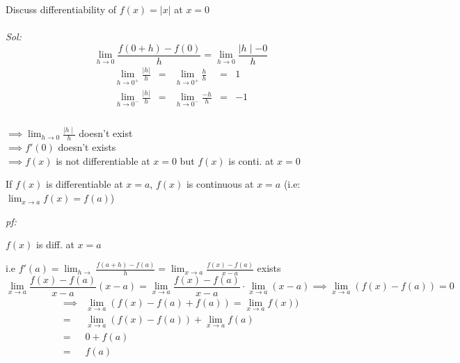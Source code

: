 \begin{eg}
Discuss differentiability of $f(x) = | x |$ at $x = 0$\\\\
\textit{Sol:}
$$\displaystyle \lim_{h \to 0} \frac{f(0 + h) - f(0)}{h} = \lim_{h \to 0} \frac{\mid h \mid -0}{h}$$
$$\begin{array}{rcccl}
\displaystyle \lim_{h \to 0^{+}} \frac{| h |}{h} & = & \displaystyle \lim_{h \to 0^{+}} \frac{h}{h} & = & 1\\
\displaystyle \lim_{h \to 0^{-}} \frac{| h |}{h} & = & \displaystyle \lim_{h \to 0^{-}} \frac{-h}{h} & = & -1\\
\end{array}$$\\
$\implies \displaystyle \lim_{h \to 0} \frac{\mid h \mid}{h}$ doesn't exist\\
$\implies f'(0)$ doesn't exists\\
$\implies f(x)$ is not differentiable at $x = 0$ but $f(x)$ is conti. at $x = 0$
\end{eg}

\begin{theorem}
If $f(x)$ is differentiable at $x = a$, $f(x)$ is continuous at $x = a$ (i.e: $\displaystyle \lim_{x \to a} f(x) = f(a)$)
\end{theorem} 

\textit{pf:}

$f(x)$ is diff. at $x = a$

i.e $\displaystyle f'(a) = \lim_{h \to} \frac{f(a+h) -f(a)}{h} = \lim_{x \to a} \frac{f(x) - f(a)}{x-a}$ exists
$$\displaystyle \lim_{x \to a} \frac{f(x) -f(a)}{x-a} (x-a) = \lim_{x \to a} \frac{f(x) -f(a)}{x-a} \cdot \lim_{x \to a} (x-a) \implies \displaystyle \lim_{x \to a} (f(x) - f(a))=0$$
$$\begin{array}{cl}
\implies & \displaystyle \lim_{x \to a} (f(x) - f(a) + f(a)) = \displaystyle \lim_{x \to a} f(x))\\
= & \displaystyle \lim_{x \to a} (f(x) - f(a)) + \lim_{x \to a} f(a)\\
= & 0 + f(a)\\
= & f(a)
\end{array}$$
